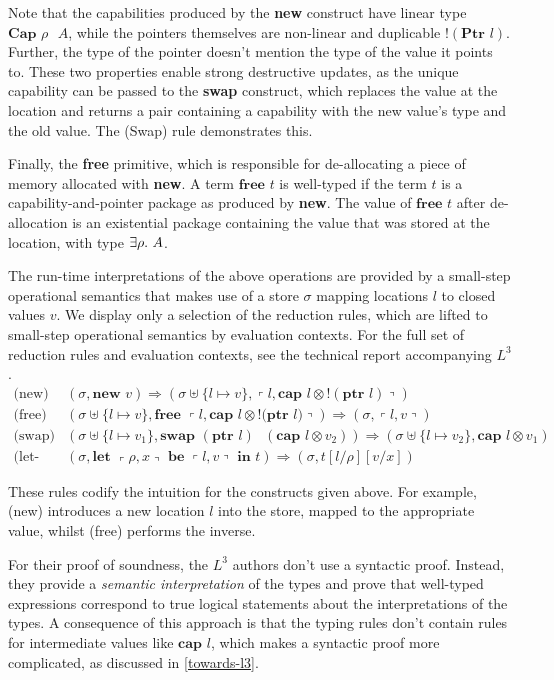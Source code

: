 \documentclass[]{unswthesis}
\newcommand{\Exists}[1]{\exists #1 \ldotp \,}
\newcommand{\letbe}[3]{\textbf{let $#1$ be $#2$ in $#3$}}
\newcommand{\Ptr}[1]{\textbf{Ptr $#1$}}
\newcommand{\ptr}[1]{\textbf{ptr $#1$}}
\newcommand{\Capa}[2]{\textbf{Cap $#1$ $#2$}}
\newcommand{\capa}[1]{\textbf{cap $#1$}}
\newcommand{\lquine}{\left\ulcorner}
\newcommand{\rquine}{\right\urcorner}
\newcommand{\lnew}[1]{\textbf{new $#1$}}
\newcommand{\lfree}[1]{\textbf{free $#1$}}
\newcommand{\lswap}[2]{\textbf{swap $#1$ $#2$}}
\newcommand{\qpair}[2]{\lquine #1, #2 \rquine}
\newcommand{\semrule}[1]{\text{(#1)}}
\let\i\textit
\let\b\textbf
\begin{document}
Note that the capabilities produced by the \b{new} construct have linear type $\Capa{\rho}{A}$, while the pointers themselves are non-linear and duplicable $!(\Ptr{l})$. Further, the type of the pointer doesn't mention the type of the value it points to. These two properties enable strong destructive updates, as the unique capability can be passed to the \b{swap} construct, which replaces the value at the location and returns a pair containing a capability with the new value's type and the old value. The (Swap) rule demonstrates this.

Finally, the \b{free} primitive, which is responsible for de-allocating a piece of memory allocated with \b{new}. A term $\lfree{t}$ is well-typed if the term $t$ is a capability-and-pointer package as produced by \b{new}. The value of $\lfree{t}$ after de-allocation is an existential package containing the value that was stored at the location, with type $\Exists{\rho} A$.

The run-time interpretations of the above operations are provided by a small-step operational semantics that makes use of a store $\sigma$ mapping locations $l$ to closed values $v$. We display only a selection of the reduction rules, which are lifted to small-step operational semantics by evaluation contexts. For the full set of reduction rules and evaluation contexts, see the technical report accompanying $L^3$ \cite{l3TechReport}.
\begin{eqnarray*}
\semrule{new} & (\sigma, \lnew{v}) \Rightarrow (\sigma \uplus \{l \mapsto v\},
  \qpair{l}{\capa{l} \otimes {!(\ptr l)}})
\\
\semrule{free} & (\sigma \uplus \{l \mapsto v\}, \lfree{\qpair{l}{\capa{l} \otimes {!(\ptr{l}})}}) \Rightarrow (\sigma, \qpair{l}{v})
\\
\semrule{swap} & (\sigma \uplus \{ l \mapsto v_1 \}, \lswap{(\ptr{l})}{(\capa{l} \otimes v_2)})
  \Rightarrow (\sigma \uplus \{ l \mapsto v_2 \}, \capa{l} \otimes v_1)
\\
\semrule{let-lpack} & (\sigma, \letbe{\qpair{\rho}{x}}{\qpair{l}{v}}{t})
  \Rightarrow
  (\sigma, t[l/\rho][v/x])
\end{eqnarray*}

These rules codify the intuition for the constructs given above. For example, (new) introduces a new location $l$ into the store, mapped to the appropriate value, whilst (free) performs the inverse.

For their proof of soundness, the $L^3$ authors don't use a syntactic proof. Instead, they provide a \i{semantic interpretation} of the types and prove that well-typed expressions correspond to true logical statements about the interpretations of the types. A consequence of this approach is that the typing rules don't contain rules for intermediate values like $\capa{l}$, which makes a syntactic proof more complicated, as discussed in \cref{towards-l3}.
\end{document}
